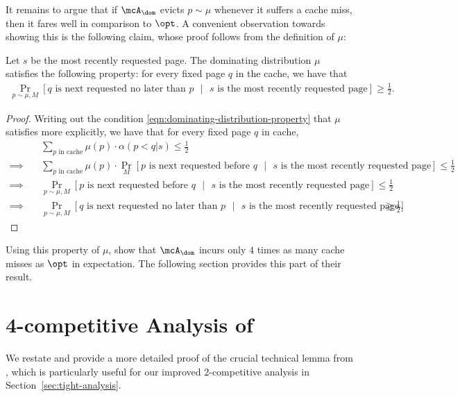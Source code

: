\documentclass[11pt]{article}
\begin{document}
It remains to argue that if $\mcA_\dom$ evicts $p \sim \mu$ whenever it suffers a cache miss, then it fares well in comparison to $\opt$. A convenient observation towards showing this is the following claim, whose proof follows from the definition of $\mu$:
\begin{claim}
    \label{claim:dominating-distribution-probability}
    Let $s$ be the most recently requested page. The dominating distribution $\mu$ satisfies the following property: for every fixed page $q$ in the cache, we have that
    \begin{align}
        \Pr_{p \sim \mu, M}[\text{$q$ is next requested no later than $p$ }|\text{ $s$ is the most recently requested page}] \ge \frac{1}{2}.
    \end{align}
\end{claim}
\begin{proof}
    Writing out the condition \eqref{eqn:dominating-distribution-property} that $\mu$ satisfies more explicitly, we have that for every fixed page $q$ in cache,
    \begin{align*}
        &\sum_{\text{$p$ in cache}}\mu(p)\cdot \alpha(p<q|s) \le \frac{1}{2} \\
        \implies \quad & \sum_{\text{$p$ in cache}}\mu(p)\cdot \Pr_M[\text{$p$ is next requested before $q$ }|\text{ $s$ is the most recently requested page}] \le \frac{1}{2} \\
        \implies \quad &\Pr_{p \sim \mu, M}[\text{$p$ is next requested before $q$ }|\text{ $s$ is the most recently requested page}] \le \frac12 \\
        \implies \quad &\Pr_{p \sim \mu, M}[\text{$q$ is next requested no later than $p$ }|\text{ $s$ is the most recently requested page}] \ge \frac{1}{2}.
    \end{align*}
\end{proof}

Using this property of $\mu$, \cite{lund1999paging} show that $\mcA_\dom$ incurs only $4$ times as many cache misses as $\opt$ in expectation. The following section provides this part of their result.

 \section{4-competitive Analysis of \cite{lund1999paging}}
\label{sec:lpr}

We restate and provide a more detailed proof of the crucial technical lemma from \cite{lund1999paging}, which is particularly useful for our improved $2$-competitive analysis in Section~\ref{sec:tight-analysis}.
\end{document}

